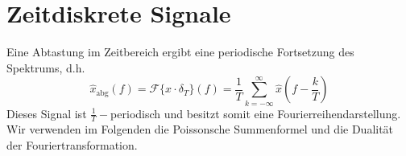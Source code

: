 \documentclass[11pt]{article}
\newcommand{\invtransform}[2]{%
    \begin{tikzpicture}
        \filldraw[thick] (0,0) circle (0.1);
        \draw[thick] (0.1,0) -- (#2 -0.1,0) node[midway, above] {#1};
        \draw[thick] (#2,0) circle (0.1);
    \end{tikzpicture}%
}
\begin{document}


\section*{Zeitdiskrete Signale}
\vspace*{-0.5cm}
Eine Abtastung im Zeitbereich ergibt eine periodische Fortsetzung des Spektrums, d.h.
$$\hat{x}_{\text{abg}}(f) = \mathcal{F}\{x \cdot \delta_T\}(f) = \frac{1}{T}\sum_{k=-\infty}^{\infty}\hat{x}\left( f- \frac{k}{T} \right)$$
Dieses Signal ist $\frac{1}{T}-$periodisch und besitzt somit eine Fourierreihendarstellung. Wir verwenden im Folgenden die Poissonsche Summenformel und die Dualität der Fouriertransformation.
\end{document}
